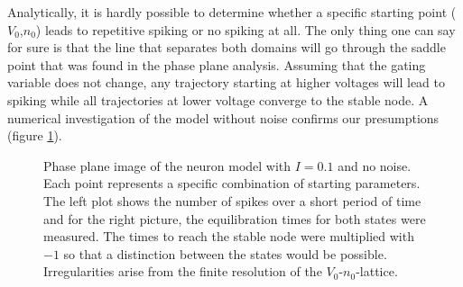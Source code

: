 \documentclass[12pt,a4paper]{article}
\begin{document}
Analytically, it is hardly possible to determine whether a specific starting point ($V_0$,$n_0$) leads to repetitive spiking or no spiking at all. The only thing one can say for sure is that the line that separates both domains will go through the saddle point that was found in the phase plane analysis. Assuming that the gating variable does not change, any trajectory starting at higher voltages will lead to spiking while all trajectories at lower voltage converge to the stable node. A numerical investigation of the model without noise confirms our presumptions (figure \ref{twodom}).
\begin{figure}[H]
	\hspace*{-0.5cm}

	\caption{Phase plane image of the neuron model with $I=0.1$ and no noise. Each point represents a specific combination of starting parameters. The left plot shows the number of spikes over a short period of time and for the right picture, the equilibration times for both states were measured. The times to reach the stable node were multiplied with $-1$ so that a distinction between the states would be possible. Irregularities arise from the finite resolution of the $V_0$-$n_0$-lattice.}
	\label{twodom}
\end{figure}		
\end{document}
